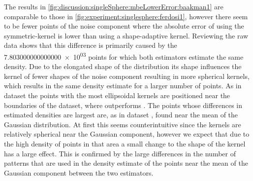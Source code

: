 		The results in \cref{fig:discussion:singleSphere:mbeLowerError:baakman1} are comparable to those in \cref{fig:experiment:singlesphere:ferdosi1}, however there seem to be fewer points of the noise component where the absolute error of using the symmetric-kernel is lower than using a shape-adaptive kernel. Reviewing the raw data shows that this difference is primarily caused by the \num{7.803000000000000e+03} points for which both estimators estimate the same density. Due to the elongated shape of the distribution its shape influences the kernel of fewer shapes of the noise component resulting in more spherical kernels, which results in the same density estimate for a larger number of points. 
		As in dataset \ferdosiOne the points with the most ellipsoidal kernels are positioned near the boundaries of the dataset, where \sambe outperforms \mbe. 
		The points whose differences in estimated densities are largest are, as in dataset \ferdosiOne, found near the mean of the Gaussian distribution. At first this seems counterintuitive since the kernels are relatively spherical near the Gaussian component, however we expect that due to the high density of points in that area a small change to the shape of the kernel has a large effect. This is confirmed by the large differences in the number of patterns that are used in the density estimate of the points near the mean of the Gaussian component between the two estimators. 






	
